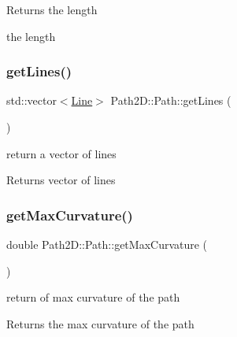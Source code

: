 \begin{DoxyReturn}{Returns}
the length 

the length 
\end{DoxyReturn}
\mbox{\label{class_path2_d_1_1_path_a8961bcc1f2c03640028e181c4d7af163}} 
\subsubsection{\texorpdfstring{get\+Lines()}{getLines()}}
{\footnotesize\ttfamily std\+::vector$<$\mbox{\hyperlink{class_path2_d_1_1_element_1_1_line}{Line}}$>$ Path2\+D\+::\+Path\+::get\+Lines (\begin{DoxyParamCaption}{ }\end{DoxyParamCaption})}



return a vector of lines 

\begin{DoxyReturn}{Returns}
vector of lines 
\end{DoxyReturn}
\mbox{\label{class_path2_d_1_1_path_a250605196731ec8e482dcb31673a6384}} 
\subsubsection{\texorpdfstring{get\+Max\+Curvature()}{getMaxCurvature()}}
{\footnotesize\ttfamily double Path2\+D\+::\+Path\+::get\+Max\+Curvature (\begin{DoxyParamCaption}{ }\end{DoxyParamCaption})}



return of max curvature of the path 

\begin{DoxyReturn}{Returns}
the max curvature of the path 
\end{DoxyReturn}
\mbox{\label{class_path2_d_1_1_path_acf811e8439f1e603050b74b34acd6814}} 
